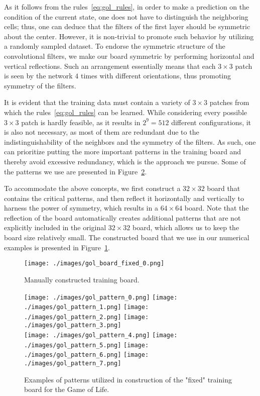 \documentclass[letterpaper]{article} %
\begin{document}
As it follows from the rules~\eqref{eq:gol_rules}, in order to make a prediction on the condition of the current state, one does not have to distinguish the neighboring cells; thus, one can deduce that the filters of the first layer should be symmetric about the center.
However, it is non-trivial to promote such behavior by utilizing a randomly sampled dataset.
To endorse the symmetric structure of the convolutional filters, we make our board symmetric by performing horizontal and vertical reflections.
Such an arrangement essentially means that each $3 \times 3$ patch is seen by the network $4$ times with different orientations, thus promoting symmetry of the filters.

It is evident that the training data must contain a variety of $3 \times 3$ patches from which the rules~\eqref{eq:gol_rules} can be learned.
While considering every possible $3 \times 3$ patch is hardly feasible, as it results in $2^9 = 512$ different configurations, it is also not necessary, as most of them are redundant due to the indistinguishability of the neighbors and the symmetry of the filters.
As such, one can prioritize putting the more important patterns in the training board and thereby avoid excessive redundancy, which is the approach we pursue.
Some of the patterns we use are presented in Figure~\ref{fig:gol_patterns}.

To accommodate the above concepts, we first construct a $32 \times 32$ board that contains the critical patterns, and then reflect it horizontally and vertically to harness the power of symmetry, which results in a $64 \times 64$ board.
Note that the reflection of the board automatically creates additional patterns that are not explicitly included in the original $32 \times 32$ board, which allows us to keep the board size relatively small.
The constructed board that we use in our numerical examples is presented in Figure~\ref{fig:gol_board_fixed}.

\begin{figure}[t]
    \centering
    \texttt{[image: ./images/gol\_board\_fixed\_0.png]}
    \caption{Manually constructed training board.}
    \label{fig:gol_board_fixed}
\end{figure}

\begin{figure}[h]
    \centering
    \texttt{[image: ./images/gol\_pattern\_0.png]}
    \texttt{[image: ./images/gol\_pattern\_1.png]}
    \texttt{[image: ./images/gol\_pattern\_2.png]}
    \texttt{[image: ./images/gol\_pattern\_3.png]}
    \\
    \texttt{[image: ./images/gol\_pattern\_4.png]}
    \texttt{[image: ./images/gol\_pattern\_5.png]}
    \texttt{[image: ./images/gol\_pattern\_6.png]}
    \texttt{[image: ./images/gol\_pattern\_7.png]}
    \caption{Examples of patterns utilized in construction of the "fixed" training board for the Game of Life.}
    \label{fig:gol_patterns}
\end{figure}
\end{document}
